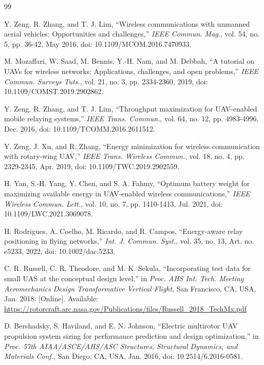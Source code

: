 \documentclass[twocolumn,letterpaper]{IEEEAerospaceCLS}
\begin{document}
\begin{thebibliography}{99}
\small
\setlength{\itemsep}{1pt}

 Y. Zeng, R. Zhang, and T. J. Lim, ``Wireless communications with unmanned aerial vehicles: Opportunities and challenges,'' \emph{IEEE Commun. Mag.}, vol. 54, no. 5, pp. 36-42, May 2016, doi: 10.1109/MCOM.2016.7470933.

 M. Mozaffari, W. Saad, M. Bennis, Y.-H. Nam, and M. Debbah, ``A tutorial on UAVs for wireless networks: Applications, challenges, and open problems,'' \emph{IEEE Commun. Surveys Tuts.}, vol. 21, no. 3, pp. 2334-2360, 2019, doi: 10.1109/COMST.2019.2902862.

 Y. Zeng, R. Zhang, and T. J. Lim, ``Throughput maximization for UAV-enabled mobile relaying systems,'' \emph{IEEE Trans. Commun.}, vol. 64, no. 12, pp. 4983-4996, Dec. 2016, doi: 10.1109/TCOMM.2016.2611512.

 Y. Zeng, J. Xu, and R. Zhang, ``Energy minimization for wireless communication with rotary-wing UAV,'' \emph{IEEE Trans. Wireless Commun.}, vol. 18, no. 4, pp. 2329-2345, Apr. 2019, doi: 10.1109/TWC.2019.2902559.

 H. Yan, S.-H. Yang, Y. Chen, and S. A. Fahmy, ``Optimum battery weight for maximizing available energy in UAV-enabled wireless communications,'' \emph{IEEE Wireless Commun. Lett.}, vol. 10, no. 7, pp. 1410-1413, Jul. 2021, doi: 10.1109/LWC.2021.3069078.

 H. Rodrigues, A. Coelho, M. Ricardo, and R. Campos, ``Energy-aware relay positioning in flying networks,'' \emph{Int. J. Commun. Syst.}, vol. 35, no. 13, Art. no. e5233, 2022, doi: 10.1002/dac.5233.

 C. R. Russell, C. R. Theodore, and M. K. Sekula, ``Incorporating test data for small UAS at the conceptual design level,'' in \emph{Proc. AHS Int. Tech. Meeting Aeromechanics Design Transformative Vertical Flight}, San Francisco, CA, USA, Jan. 2018. [Online]. Available: \url{https://rotorcraft.arc.nasa.gov/Publications/files/Russell_2018_TechMx.pdf}

 D. Bershadsky, S. Haviland, and E. N. Johnson, ``Electric multirotor UAV propulsion system sizing for performance prediction and design optimization,'' in \emph{Proc. 57th AIAA/ASCE/AHS/ASC Structures, Structural Dynamics, and Materials Conf.}, San Diego, CA, USA, Jan. 2016, doi: 10.2514/6.2016-0581.


\end{thebibliography}
\end{document}
